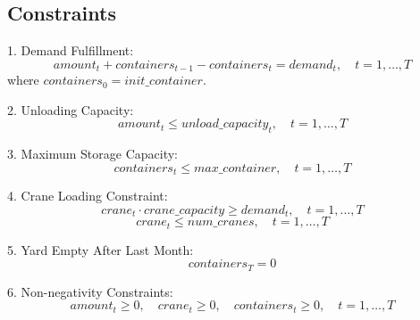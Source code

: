 \documentclass{article}
\begin{document}
\subsection*{Constraints}
1. Demand Fulfillment:
\[
amount_{t} + containers_{t-1} - containers_{t} = demand_{t}, \quad t = 1, \ldots, T
\]
where \( containers_{0} = init\_container \).

2. Unloading Capacity:
\[
amount_{t} \leq unload\_capacity_{t}, \quad t = 1, \ldots, T
\]

3. Maximum Storage Capacity:
\[
containers_{t} \leq max\_container, \quad t = 1, \ldots, T
\]

4. Crane Loading Constraint:
\[
crane_{t} \cdot crane\_capacity \geq demand_{t}, \quad t = 1, \ldots, T
\]
\[
crane_{t} \leq num\_cranes, \quad t = 1, \ldots, T
\]

5. Yard Empty After Last Month:
\[
containers_{T} = 0
\]

6. Non-negativity Constraints:
\[
amount_{t} \geq 0, \quad crane_{t} \geq 0, \quad containers_{t} \geq 0, \quad t = 1, \ldots, T
\]
\end{document}

